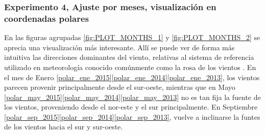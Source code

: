 \subsubsection{Experimento 4, Ajuste por meses, visualización en coordenadas polares}
En las figuras agrupadas \ref{fig:PLOT_MONTHS_1} y \ref{fig:PLOT_MONTHS_2} se aprecia una visualización más interesante. Allí se puede ver de forma más intuitiva las direcciones dominantes del viento, relativas al sistema de referencia utilizado en meteorología conocido comúnmente como la rosa de los vientos \cite{RosaViento}. En el mes de Enero \ref{polar_ene_2015}\ref{polar_ene_2014}\ref{polar_ene_2013}, los vientos parecen provenir principalmente desde el sur-oeste, mientras que en Mayo \ref{polar_may_2015}\ref{polar_may_2014}\ref{polar_may_2013} no es tan fija la fuente de los vientos, proveniendo desde el nor-este y el sur principalmente. En Septiembre \ref{polar_sep_2015}\ref{polar_sep_2014}\ref{polar_sep_2013}, vuelve a inclinarse la funtes de los vientos hacia el sur y sur-oeste.
